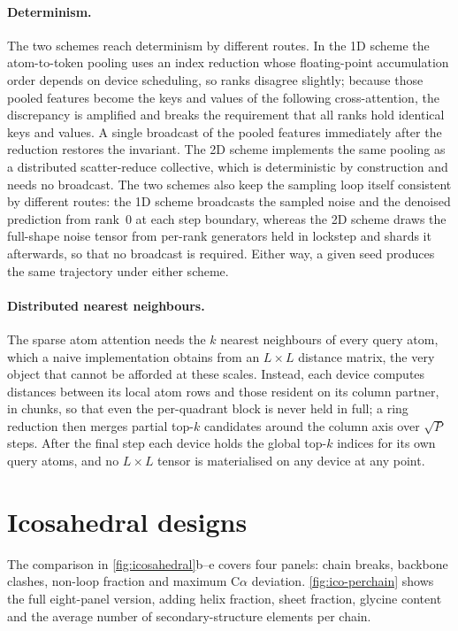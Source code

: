 \paragraph{Determinism.}
The two schemes reach determinism by different routes. In the 1D scheme the
atom-to-token pooling uses an index reduction whose floating-point accumulation
order depends on device scheduling, so ranks disagree slightly; because those
pooled features become the keys and values of the following cross-attention, the
discrepancy is amplified and breaks the requirement that all ranks hold identical
keys and values. A single broadcast of the pooled features immediately after the
reduction restores the invariant. The 2D scheme implements the same pooling as a
distributed scatter-reduce collective, which is deterministic by construction and
needs no broadcast. The two schemes also keep the sampling loop itself consistent
by different routes: the 1D scheme broadcasts the sampled noise and the denoised
prediction from rank~$0$ at each step boundary, whereas the 2D scheme draws the
full-shape noise tensor from per-rank generators held in lockstep and shards it
afterwards, so that no broadcast is required. Either way, a given seed produces
the same trajectory under either scheme.

\paragraph{Distributed nearest neighbours.}
The sparse atom attention needs the $k$ nearest neighbours of every query atom,
which a naive implementation obtains from an $L\times L$ distance matrix, the very
object that cannot be afforded at these scales. Instead, each device computes
distances between its local atom rows and those resident on its column partner,
in chunks, so that even the per-quadrant block is never held in full; a ring
reduction then merges partial top-$k$ candidates around the column axis over
$\sqrt{P}$ steps. After the final step each device holds the global top-$k$
indices for its own query atoms, and no $L\times L$ tensor is materialised on any
device at any point.

\clearpage
\section{Icosahedral designs}
\label{app:ico}

The comparison in \cref{fig:icosahedral}b--e covers four panels: chain
breaks, backbone clashes, non-loop fraction and maximum C$\alpha$ deviation.
\cref{fig:ico-perchain} shows the full eight-panel version, adding helix
fraction, sheet fraction, glycine content and the average number of
secondary-structure elements per chain.

